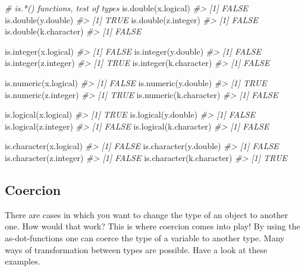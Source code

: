 \documentclass[
]{book}
\newenvironment{Shaded}{\begin{snugshade}}{\end{snugshade}}
\newcommand{\CommentTok}[1]{\textcolor[rgb]{0.56,0.35,0.01}{\textit{#1}}}
\newcommand{\FunctionTok}[1]{\textcolor[rgb]{0.00,0.00,0.00}{#1}}
\newcommand{\NormalTok}[1]{#1}
\begin{document}
\begin{Shaded}
\begin{Highlighting}[]
\CommentTok{\# is.*() functions, test of types}
\FunctionTok{is.double}\NormalTok{(x.logical)}
\CommentTok{\#\textgreater{} [1] FALSE}
\FunctionTok{is.double}\NormalTok{(y.double)}
\CommentTok{\#\textgreater{} [1] TRUE}
\FunctionTok{is.double}\NormalTok{(z.integer)}
\CommentTok{\#\textgreater{} [1] FALSE}
\FunctionTok{is.double}\NormalTok{(k.character)}
\CommentTok{\#\textgreater{} [1] FALSE}

\FunctionTok{is.integer}\NormalTok{(x.logical)}
\CommentTok{\#\textgreater{} [1] FALSE}
\FunctionTok{is.integer}\NormalTok{(y.double)}
\CommentTok{\#\textgreater{} [1] FALSE}
\FunctionTok{is.integer}\NormalTok{(z.integer)}
\CommentTok{\#\textgreater{} [1] TRUE}
\FunctionTok{is.integer}\NormalTok{(k.character)}
\CommentTok{\#\textgreater{} [1] FALSE}

\FunctionTok{is.numeric}\NormalTok{(x.logical)}
\CommentTok{\#\textgreater{} [1] FALSE}
\FunctionTok{is.numeric}\NormalTok{(y.double)}
\CommentTok{\#\textgreater{} [1] TRUE}
\FunctionTok{is.numeric}\NormalTok{(z.integer)}
\CommentTok{\#\textgreater{} [1] TRUE}
\FunctionTok{is.numeric}\NormalTok{(k.character)}
\CommentTok{\#\textgreater{} [1] FALSE}

\FunctionTok{is.logical}\NormalTok{(x.logical)}
\CommentTok{\#\textgreater{} [1] TRUE}
\FunctionTok{is.logical}\NormalTok{(y.double)}
\CommentTok{\#\textgreater{} [1] FALSE}
\FunctionTok{is.logical}\NormalTok{(z.integer)}
\CommentTok{\#\textgreater{} [1] FALSE}
\FunctionTok{is.logical}\NormalTok{(k.character)}
\CommentTok{\#\textgreater{} [1] FALSE}

\FunctionTok{is.character}\NormalTok{(x.logical)}
\CommentTok{\#\textgreater{} [1] FALSE}
\FunctionTok{is.character}\NormalTok{(y.double)}
\CommentTok{\#\textgreater{} [1] FALSE}
\FunctionTok{is.character}\NormalTok{(z.integer)}
\CommentTok{\#\textgreater{} [1] FALSE}
\FunctionTok{is.character}\NormalTok{(k.character)}
\CommentTok{\#\textgreater{} [1] TRUE}
\end{Highlighting}
\end{Shaded}

\hypertarget{coercion}{%
\subsection{Coercion}\label{coercion}}

There are cases in which you want to change the type of an object to another one. How would that work? This is where coercion comes into play! By using the as-dot-functions one can coerce the type of a variable to another type. Many ways of transformation between types are possible. Have a look at these examples.
\end{document}
